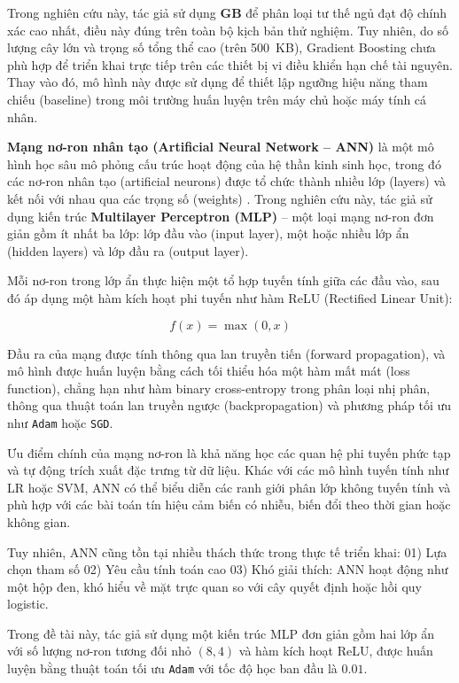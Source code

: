 Trong nghiên cứu này, tác giả sử 
dụng \textbf{GB} để phân loại tư thế ngủ đạt độ chính xác cao nhất, điều này đúng trên toàn bộ kịch bản thử nghiệm.
Tuy nhiên, do số lượng cây lớn và trọng số tổng thể cao (trên 500~KB), Gradient Boosting chưa phù hợp để triển khai 
trực tiếp trên các thiết bị vi điều khiển hạn chế tài nguyên. Thay vào đó, mô hình này được sử dụng để thiết lập ngưỡng hiệu năng tham chiếu (baseline) trong môi trường huấn luyện trên máy chủ hoặc máy tính cá nhân.


\textbf{Mạng nơ-ron nhân tạo (Artificial Neural Network – ANN)} là một 
mô hình học sâu mô phỏng cấu trúc hoạt động của hệ thần kinh sinh học, 
trong đó các nơ-ron nhân tạo (artificial neurons) được tổ chức thành nhiều 
lớp (layers) và kết nối với nhau qua các trọng số (weights) \cite{jain1996}. 
Trong nghiên cứu này, tác giả sử dụng kiến trúc \textbf{Multilayer Perceptron (MLP)} – 
một loại mạng nơ-ron đơn giản gồm ít nhất ba lớp: lớp đầu vào (input layer), 
một hoặc nhiều lớp ẩn (hidden layers) và lớp đầu ra (output layer).

Mỗi nơ-ron trong lớp ẩn thực hiện một tổ hợp tuyến tính giữa các đầu vào, 
sau đó áp dụng một hàm kích hoạt phi tuyến như hàm ReLU 
(Rectified Linear Unit):

\begin{equation}
    f(x) = \max(0, x)
\end{equation}

Đầu ra của mạng được tính thông qua lan truyền tiến (forward propagation), 
và mô hình được huấn luyện bằng cách tối thiểu hóa một hàm mất mát 
(loss function), chẳng hạn như hàm binary cross-entropy trong phân 
loại nhị phân, thông qua thuật toán lan truyền ngược (backpropagation) và 
phương pháp tối ưu như \texttt{Adam} hoặc \texttt{SGD}.

Ưu điểm chính của mạng nơ-ron là khả năng học các quan hệ phi tuyến 
phức tạp và tự động trích xuất đặc trưng từ dữ liệu. Khác với các mô 
hình tuyến tính như LR hoặc SVM, ANN có thể biểu diễn các ranh giới 
phân lớp không tuyến tính và phù hợp với các bài toán tín hiệu cảm 
biến có nhiễu, biến đổi theo thời gian hoặc không gian.

Tuy nhiên, ANN cũng tồn tại nhiều thách thức trong thực tế triển khai:
01) Lựa chọn tham số
02) Yêu cầu tính toán cao
03) Khó giải thích: ANN hoạt động như một hộp đen, 
khó hiểu về mặt trực quan so với cây quyết định hoặc hồi quy logistic.

Trong đề tài này, tác giả sử dụng một kiến trúc MLP đơn giản gồm hai lớp ẩn với 
số lượng nơ-ron tương đối nhỏ $(8, 4)$ và hàm kích hoạt ReLU, 
được huấn luyện bằng thuật toán tối ưu \texttt{Adam} với 
tốc độ học ban đầu là $0.01$.


